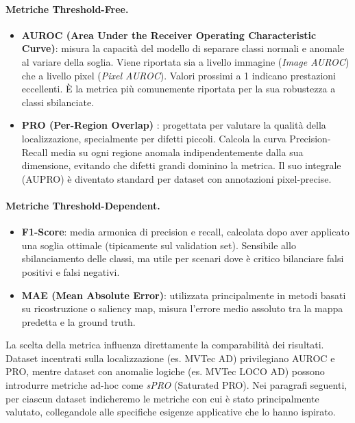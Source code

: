 \paragraph{Metriche Threshold-Free.}
\begin{itemize}
\item \textbf{AUROC (Area Under the Receiver Operating Characteristic Curve)}: misura la capacità del modello di separare classi normali e anomale al variare della soglia. Viene riportata sia a livello immagine (\textit{Image AUROC}) che a livello pixel (\textit{Pixel AUROC}). Valori prossimi a 1 indicano prestazioni eccellenti. È la metrica più comunemente riportata per la sua robustezza a classi sbilanciate.
\item \textbf{PRO (Per-Region Overlap)} \cite{bergmann2022beyond}: progettata per valutare la qualità della localizzazione, specialmente per difetti piccoli. Calcola la curva Precision-Recall media su ogni regione anomala indipendentemente dalla sua dimensione, evitando che difetti grandi dominino la metrica. Il suo integrale (AUPRO) è diventato standard per dataset con annotazioni pixel-precise.
\end{itemize}

\paragraph{Metriche Threshold-Dependent.}
\begin{itemize}
\item \textbf{F1-Score}: media armonica di precision e recall, calcolata dopo aver applicato una soglia ottimale (tipicamente sul validation set). Sensibile allo sbilanciamento delle classi, ma utile per scenari dove è critico bilanciare falsi positivi e falsi negativi.
\item \textbf{MAE (Mean Absolute Error)}: utilizzata principalmente in metodi basati su ricostruzione o saliency map, misura l'errore medio assoluto tra la mappa predetta e la ground truth.
\end{itemize}

La scelta della metrica influenza direttamente la comparabilità dei risultati. Dataset incentrati sulla localizzazione (es. MVTec AD) privilegiano AUROC e PRO, mentre dataset con anomalie logiche (es. MVTec LOCO AD) possono introdurre metriche ad-hoc come \textit{sPRO} (Saturated PRO). Nei paragrafi seguenti, per ciascun dataset indicheremo le metriche con cui è stato principalmente valutato, collegandole alle specifiche esigenze applicative che lo hanno ispirato.

